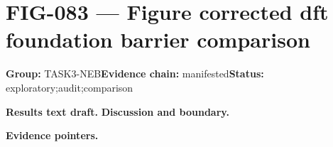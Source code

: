 \clearpage
\section{FIG-083 --- Figure corrected dft foundation barrier comparison}
\label{figpage:fig-083}
\textbf{Group:} TASK3-NEB\quad \textbf{Evidence chain:} manifested\quad \textbf{Status:} exploratory;audit;comparison

\textbf{Results text draft.} 
\textbf{Discussion and boundary.} 


\textbf{Evidence pointers.}



\vfill

